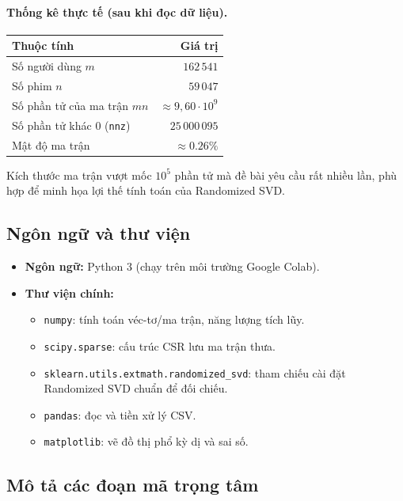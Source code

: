 \paragraph{Thống kê thực tế (sau khi đọc dữ liệu).}
\begin{center}
\begin{tabular}{|l|r|}
\hline
\textbf{Thuộc tính} & \textbf{Giá trị} \\
\hline
Số người dùng $m$ & $162\,541$ \\
Số phim $n$ & $59\,047$ \\
Số phần tử của ma trận $mn$ & $\approx 9{,}60\cdot10^9$ \\
Số phần tử khác 0 (\texttt{nnz}) & $25\,000\,095$ \\
Mật độ ma trận & $\approx 0.26\%$ \\
\hline
\end{tabular}
\end{center}

Kích thước ma trận vượt mốc $10^5$ phần tử mà đề bài yêu cầu rất nhiều lần,
phù hợp để minh họa lợi thế tính toán của Randomized SVD.

\subsection{Ngôn ngữ và thư viện}

\begin{itemize}
    \item \textbf{Ngôn ngữ:} Python 3 (chạy trên môi trường Google Colab).
    \item \textbf{Thư viện chính:}
    \begin{itemize}
        \item \texttt{numpy}: tính toán véc-tơ/ma trận, năng lượng tích lũy.
        \item \texttt{scipy.sparse}: cấu trúc CSR lưu ma trận thưa.
        \item \texttt{sklearn.utils.extmath.randomized\_svd}: tham chiếu cài đặt
        Randomized SVD chuẩn để đối chiếu.
        \item \texttt{pandas}: đọc và tiền xử lý CSV.
        \item \texttt{matplotlib}: vẽ đồ thị phổ kỳ dị và sai số.
    \end{itemize}
\end{itemize}

\subsection{Mô tả các đoạn mã trọng tâm}

